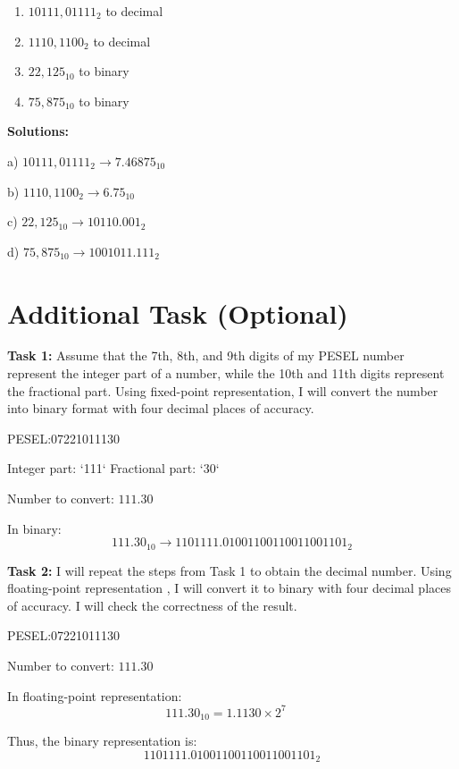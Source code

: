 \documentclass{article}
\begin{document}
\begin{enumerate}
  \item \( 10111,01111_2 \) to decimal
  \item \( 1110,1100_2 \) to decimal
  \item \( 22,125_{10} \) to binary
  \item \( 75,875_{10} \) to binary
\end{enumerate}

\textbf{Solutions:}

a) \( 10111,01111_2 \rightarrow 7.46875_{10} \)

b) \( 1110,1100_2 \rightarrow 6.75_{10} \)

c) \( 22,125_{10} \rightarrow 10110.001_{2} \)

d) \( 75,875_{10} \rightarrow 1001011.111_{2} \)

\section*{Additional Task (Optional)}

\textbf{Task 1:}  
Assume that the 7th, 8th, and 9th digits of my PESEL number represent the integer part of a number, while the 10th and 11th digits represent the fractional part. Using fixed-point representation, I will convert the number into binary format with four decimal places of accuracy.

PESEL:07221011130

Integer part: `111`  
Fractional part: `30`

Number to convert: \( 111.30 \)

In binary:
\[
111.30_{10} \rightarrow 1101111.01001100110011001101_2
\]

\textbf{Task 2:}  
I will repeat the steps from Task 1 to obtain the decimal number. Using floating-point representation , I will convert it to binary with four decimal places of accuracy. I will check the correctness of the result.

PESEL:07221011130

Number to convert: \( 111.30 \)

In floating-point representation:
\[
111.30_{10} = 1.1130 \times 2^7 \quad 
\]

Thus, the binary representation is:
\[
1101111.01001100110011001101_2
\]
\end{document}
